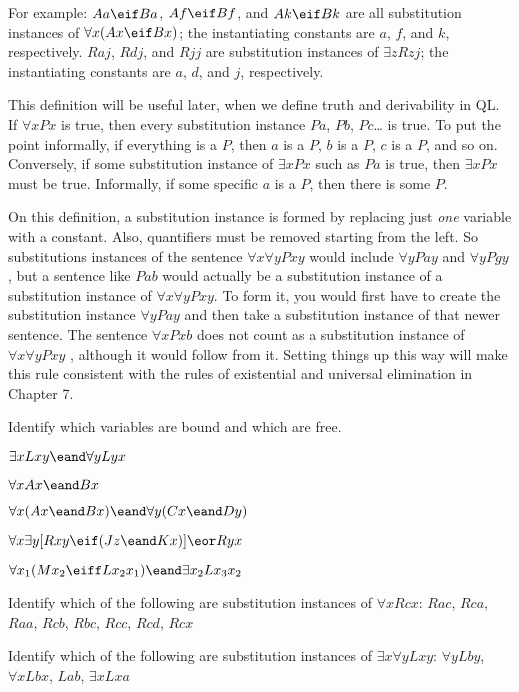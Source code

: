 For example: $Aa \eif Ba$, $Af \eif Bf$, and $Ak \eif Bk$ are all substitution instances of $\forall x(Ax \eif Bx)$; the instantiating constants are $a$, $f$, and $k$, respectively. $Raj$, $Rdj$, and $Rjj$ are substitution instances of $\exists zRzj$; the instantiating constants are $a$, $d$, and $j$, respectively.

This definition will be useful later, when we define truth and derivability in QL. If $\forall x Px$ is true, then every substitution instance $Pa$, $Pb$, $Pc${\ldots} is true. To put the point informally, if everything is a $P$, then $a$ is a $P$, $b$ is a $P$, $c$ is a $P$, and so on. Conversely, if some substitution instance of $\exists x Px$ such as $Pa$ is true, then $\exists x Px$ must be true. Informally, if some specific $a$ is a $P$, then there is some $P$.

On this definition, a substitution instance is formed by replacing just \emph{one} variable with a constant. Also, quantifiers must be removed starting from the left. So substitutions instances of the sentence $\forall x \forall y Pxy$ would include $\forall y Pay$ and $\forall y Pgy$, but a sentence like $Pab$ would actually be a substitution instance of a substitution instance of $\forall x \forall y Pxy$. To form it, you would first have to create the substitution instance  $\forall y Pay$ and then take a substitution instance of that newer sentence. The sentence $\forall x Pxb$ does not count as a substitution instance of $\forall x \forall y Pxy$ , although it would follow from it. Setting things up this way will make this rule consistent with the rules of existential and universal elimination in Chapter 7. 

\practiceproblems
\problempart
\label{pr.freeQL}
Identify which variables are bound and which are free.
\begin{kormanize}
\item $\exists x Lxy \eand \forall y Lyx$
\item $\forall x Ax \eand Bx$
\item $\forall x (Ax \eand Bx) \eand \forall y(Cx \eand Dy)$
\item $\forall x\exists y[Rxy \eif (Jz \eand Kx)] \eor Ryx$
\item $\forall x_1(Mx_2 \eiff Lx_2x_1) \eand \exists x_2 Lx_3x_2$
\end{kormanize}


\problempart
\label{pr.subinstanceQL}
\begin{kormanize}
\item Identify which of the following are substitution instances of $\forall x Rcx$: $Rac$, $Rca$, $Raa$, $Rcb$, $Rbc$, $Rcc$, $Rcd$, $Rcx$
\item Identify which of the following are substitution instances of $\exists x\forall y Lxy$:
$\forall y Lby$, $\forall x Lbx$, $Lab$, $\exists x Lxa$
\end{kormanize}

